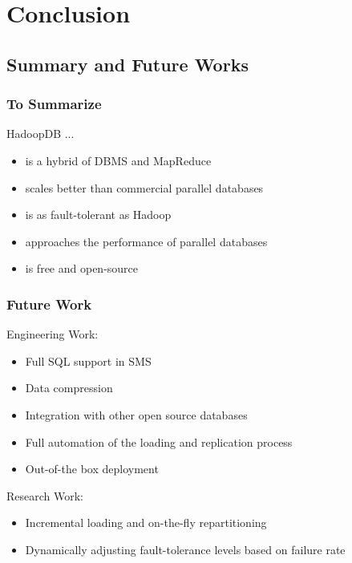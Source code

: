 \documentclass{beamer}
\begin{document}
\section{Conclusion}
\label{sec:conclusion}

\subsection{Summary and Future Works}
\begin{frame}
  \frametitle{To Summarize}
  \begin{block}{HadoopDB ...}
    \begin{itemize}
    \item is a hybrid of DBMS and MapReduce
    \item scales better than commercial parallel databases
    \item is as fault-tolerant as Hadoop
    \item approaches the performance of parallel databases
    \item is free and open-source
    \end{itemize}
  \end{block}
\end{frame}


\begin{frame}
  \frametitle{Future Work}
  Engineering Work:
  \begin{itemize}
  \item Full SQL support in SMS 
  \item Data compression
  \item Integration with other open source databases
  \item Full automation of the loading and replication process
  \item Out-of-the box deployment
  \end{itemize}
  Research Work:
  \begin{itemize}
  \item Incremental loading and on-the-fly repartitioning
  \item Dynamically adjusting fault-tolerance levels based on failure
    rate
  \end{itemize}

\end{frame}
\end{document}
